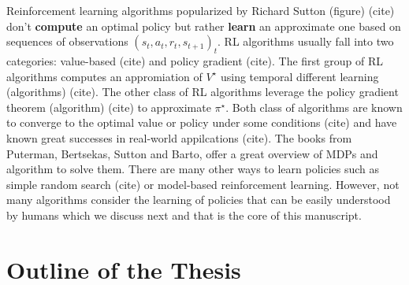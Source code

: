 Reinforcement learning algorithms popularized by Richard Sutton (figure) (cite) don't \textbf{compute} an optimal policy but rather \textbf{learn} an approximate one based on sequences of observations ${(s_t, a_t, r_t, s_{t+1})}_t$.
RL algorithms usually fall into two categories: value-based (cite) and policy gradient (cite). The first group of RL algorithms computes an appromiation of $V^{\star}$ using temporal different learning (algorithms) (cite). The other class of RL algorithms leverage the policy gradient theorem (algorithm) (cite) to approximate $\pi^{\star}$.
Both class of algorithms are known to converge to the optimal value or policy under some conditions (cite) and have known great successes in real-world appilcations (cite).
The books from Puterman, Bertsekas, Sutton and Barto, offer a great overview of MDPs and algorithm to solve them.
There are many other ways to learn policies such as simple random search (cite) or model-based reinforcement learning. However, not many algorithms consider the learning of policies that can be easily understood by humans which we discuss next and that is the core of this manuscript.

\section{Outline of the Thesis}

